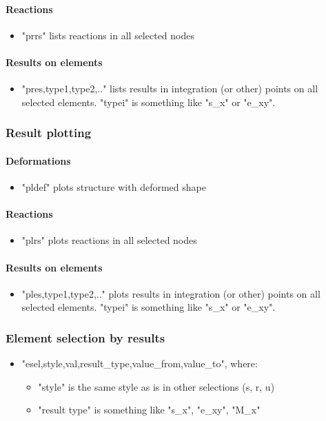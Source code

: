 \documentclass{article}
\begin{document}
\paragraph{Reactions}
\begin{itemize}
\item  "prrs" lists reactions in all selected nodes
\end{itemize}

\paragraph{Results on elements}
\begin{itemize}
\item  "pres,type1,type2,.." lists results in integration (or other) points on all selected elements. "typei" is something like "s\_x" or "e\_xy". 
\end{itemize}

\subsubsection{Result plotting}

\paragraph{Deformations}
\begin{itemize}
\item  "pldef" plots structure with deformed shape
\end{itemize}

\paragraph{Reactions}
\begin{itemize}
\item  "plrs" plots reactions in all selected nodes
\end{itemize}

\paragraph{Results on elements}
\begin{itemize}
\item  "ples,type1,type2,.." plots results in integration (or other) points on all selected elements. "typei" is something like "s\_x" or "e\_xy". 
\end{itemize}

\subsubsection{Element selection by results}
\begin{itemize}
\item  "esel,style,val,result\_type,value\_from,value\_to", where:\begin{itemize}
\item  "style" is the same style as is in other selections (s, r, u)
\item  "result type" is something like "s\_x", "e\_xy", "M\_x"
\end{itemize}
\end{itemize}
\end{document}
